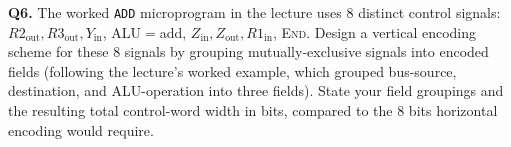 \documentclass[11pt]{article}
\begin{document}
\textbf{Q6.} The worked \texttt{ADD} microprogram in the lecture uses 8 distinct control signals: $R2_{\text{out}}, R3_{\text{out}}, Y_{\text{in}}$, ALU$=$add, $Z_{\text{in}}, Z_{\text{out}}, R1_{\text{in}}$, \textsc{End}. Design a vertical encoding scheme for these 8 signals by grouping mutually-exclusive signals into encoded fields (following the lecture's worked example, which grouped bus-source, destination, and ALU-operation into three fields). State your field groupings and the resulting total control-word width in bits, compared to the 8 bits horizontal encoding would require.
\end{document}
